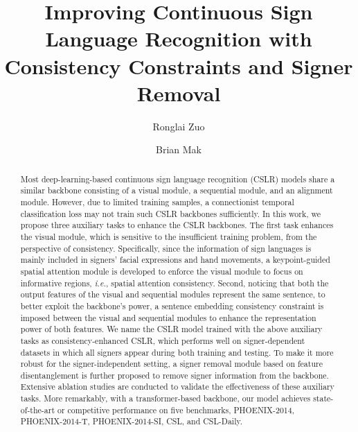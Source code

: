 \documentclass[acmsmall,screen]{acmart}
\def\ie{\emph{i.e.}} \def\Ie{\emph{I.e.}}
\begin{document}
\title{Improving Continuous Sign Language Recognition with Consistency Constraints and Signer Removal}

\author{Ronglai Zuo}
\author{Brian Mak}















\renewcommand{\shortauthors}{Ronglai Zuo and Brian Mak}

\begin{abstract}
Most deep-learning-based continuous sign language recognition (CSLR) models share a similar backbone consisting of a visual module, a sequential module, and an alignment module. 
However, due to limited training samples, a connectionist temporal classification loss may not train such CSLR backbones sufficiently. 
In this work, we propose three auxiliary tasks to enhance the CSLR backbones.
The first task enhances the visual module, which is sensitive to the insufficient training problem, from the perspective of consistency. 
Specifically, since the information of sign languages is mainly included in signers' facial expressions and hand movements, a keypoint-guided spatial attention module is developed to enforce the visual module to focus on informative regions, \ie, spatial attention consistency.
Second, noticing that both the output features of the visual and sequential modules represent the same sentence, to better exploit the backbone's power, a sentence embedding consistency constraint is imposed between the visual and sequential modules to enhance the representation power of both features.
We name the CSLR model trained with the above auxiliary tasks as consistency-enhanced CSLR, which performs well on signer-dependent datasets in which all signers appear during both training and testing.
To make it more robust for the signer-independent setting, a signer removal module based on feature disentanglement is further proposed to remove signer information from the backbone.
Extensive ablation studies are conducted to validate the effectiveness of these auxiliary tasks.
More remarkably, with a transformer-based backbone, our model achieves state-of-the-art or competitive performance on five benchmarks, PHOENIX-2014, PHOENIX-2014-T, PHOENIX-2014-SI, CSL, and CSL-Daily.
\end{abstract} 
\end{document}
